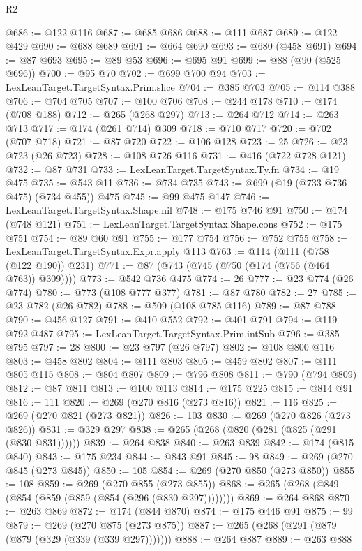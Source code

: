 \begin{lexlean}{R2}
\begin{coremodule}
@686 := @122 @116
@687 := @685 @686
@688 := @111 @687
@689 := @122 @429
@690 := @688 @689
@691 := @664 @690
@693 := @680 (@458 @691)
@694 := @87 @693
@695 := @89 @53
@696 := @695 @91
@699 := @88 (@90 (@525 @696))
@700 := @95 @70
@702 := @699 @700 @94
@703 := LexLeanTarget.TargetSyntax.Prim.slice
@704 := @385 @703
@705 := @114 @388
@706 := @704 @705
@707 := @100 @706
@708 := @244 @178
@710 := @174 (@708 @188)
@712 := @265 (@268 @297)
@713 := @264 @712
@714 := @263 @713
@717 := @174 (@261 @714) @309
@718 := @710 @717
@720 := @702 (@707 @718)
@721 := @87 @720
@722 := @106 @128
@723 := 25
@726 := @23 @723 (@26 @723)
@728 := @108 @726 @116
@731 := @416 (@722 @728 @121)
@732 := @87 @731
@733 := LexLeanTarget.TargetSyntax.Ty.fn
@734 := @19 @475
@735 := @543 @11
@736 := @734 @735
@743 := @699 (@19 (@733 @736 @475) (@734 @455)) @475
@745 := @99 @475 @147
@746 := LexLeanTarget.TargetSyntax.Shape.nil
@748 := @175 @746 @91
@750 := @174 (@748 @121)
@751 := LexLeanTarget.TargetSyntax.Shape.cons
@752 := @175 @751
@754 := @89 @60 @91
@755 := @177 @754
@756 := @752 @755
@758 := LexLeanTarget.TargetSyntax.Expr.apply @113
@763 := @114 (@111 (@758 (@122 @190)) @231)
@771 := @87 (@743 (@745 (@750 (@174 (@756 (@464 @763)) @309))))
@773 := @542 @736 @475
@774 := 26
@777 := @23 @774 (@26 @774)
@780 := @773 (@108 @777 @377)
@781 := @87 @780
@782 := 27
@785 := @23 @782 (@26 @782)
@788 := @509 (@108 @785 @116)
@789 := @87 @788
@790 := @456 @127
@791 := @410 @552
@792 := @401 @791
@794 := @119 @792 @487
@795 := LexLeanTarget.TargetSyntax.Prim.intSub
@796 := @385 @795
@797 := 28
@800 := @23 @797 (@26 @797)
@802 := @108 @800 @116
@803 := @458 @802
@804 := @111 @803
@805 := @459 @802
@807 := @111 @805 @115
@808 := @804 @807
@809 := @796 @808
@811 := @790 (@794 @809)
@812 := @87 @811
@813 := @100 @113
@814 := @175 @225
@815 := @814 @91
@816 := 111
@820 := @269 (@270 @816 (@273 @816))
@821 := 116
@825 := @269 (@270 @821 (@273 @821))
@826 := 103
@830 := @269 (@270 @826 (@273 @826))
@831 := @329 @297
@838 := @265 (@268 (@820 (@281 (@825 (@291 (@830 @831))))))
@839 := @264 @838
@840 := @263 @839
@842 := @174 (@815 @840)
@843 := @175 @234
@844 := @843 @91
@845 := 98
@849 := @269 (@270 @845 (@273 @845))
@850 := 105
@854 := @269 (@270 @850 (@273 @850))
@855 := 108
@859 := @269 (@270 @855 (@273 @855))
@868 := @265 (@268 (@849 (@854 (@859 (@859 (@854 (@296 (@830 @297))))))))
@869 := @264 @868
@870 := @263 @869
@872 := @174 (@844 @870)
@874 := @175 @446 @91
@875 := 99
@879 := @269 (@270 @875 (@273 @875))
@887 := @265 (@268 (@291 (@879 (@879 (@329 (@339 (@339 @297)))))))
@888 := @264 @887
@889 := @263 @888

\end{coremodule}
\end{lexlean}
